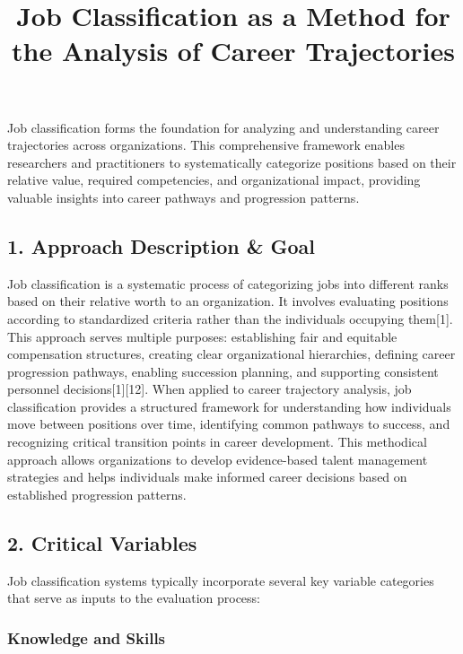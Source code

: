 \documentclass[
  letterpaper,
  DIV=11,
  numbers=noendperiod]{scrartcl}
\title{Job Classification as a Method for the Analysis of Career
Trajectories}
\author{}
\date{}
\begin{document}
\maketitle


Job classification forms the foundation for analyzing and understanding
career trajectories across organizations. This comprehensive framework
enables researchers and practitioners to systematically categorize
positions based on their relative value, required competencies, and
organizational impact, providing valuable insights into career pathways
and progression patterns.

\subsection{1. Approach Description \&
Goal}\label{approach-description-goal}

Job classification is a systematic process of categorizing jobs into
different ranks based on their relative worth to an organization. It
involves evaluating positions according to standardized criteria rather
than the individuals occupying them{[}1{]}. This approach serves
multiple purposes: establishing fair and equitable compensation
structures, creating clear organizational hierarchies, defining career
progression pathways, enabling succession planning, and supporting
consistent personnel decisions{[}1{]}{[}12{]}. When applied to career
trajectory analysis, job classification provides a structured framework
for understanding how individuals move between positions over time,
identifying common pathways to success, and recognizing critical
transition points in career development. This methodical approach allows
organizations to develop evidence-based talent management strategies and
helps individuals make informed career decisions based on established
progression patterns.

\subsection{2. Critical Variables}\label{critical-variables}

Job classification systems typically incorporate several key variable
categories that serve as inputs to the evaluation process:

\subsubsection{Knowledge and Skills}\label{knowledge-and-skills}
\end{document}
